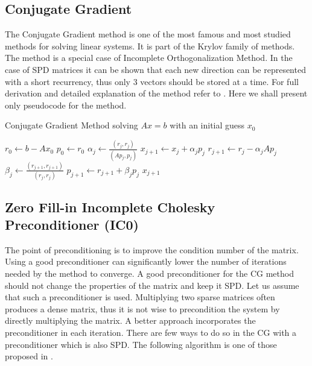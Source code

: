 \subsection{Conjugate Gradient}
The Conjugate Gradient method is one of the most famous and most studied methods for solving linear systems. It is part of the Krylov family of methods. The method is a special case of Incomplete Orthogonalization Method. In the case of SPD matrices it can be shown that each new direction can be represented with a short recurrency, thus only 3 vectors should be stored at a time. For full derivation and detailed explanation of the method refer to \cite{saad-sparse}. Here we shall present only pseudocode for the method.

\begin{algorithm}[H]
\centering
\caption{Conjugate Gradient Method solving $Ax=b$ with an initial guess $x_0$}\label{alg:CG}
\begin{algorithmic}[1]
			\State $r_0 \gets b - Ax_0$
			\State $p_0 \gets r_0$
				\State $\alpha_j \gets \frac{(r_j, r_j)}{(Ap_j, p_j)}$
				\State $x_{j+1} \gets x_j + \alpha_j p_j$
				\State $r_{j+1} \gets r_j - \alpha_j Ap_j$
				\State $\beta_j \gets \frac{(r_{j+1}, r_{j+1})}{(r_j, r_j)}$
				\State $p_{j+1} \gets r_{j+1} + \beta_j p_j$
			\EndFor
			\State \Return $x_{j+1}$
		\EndProcedure
\end{algorithmic}
\end{algorithm}

\subsection{Zero Fill-in Incomplete Cholesky Preconditioner (IC0)}
The point of preconditioning is to improve the condition number of the matrix. Using a good preconditioner can significantly lower the number of iterations needed by the method to converge. A good preconditioner for the CG method should not change the properties of the matrix and keep it SPD. Let us assume that such a preconditioner is used. Multiplying two sparse matrices often produces a dense matrix, thus it is not wise to precondition the system by directly multiplying the matrix. A better approach incorporates the preconditioner in each iteration. There are few ways to do so in the CG with a preconditioner which is also SPD. The following algorithm is one of those proposed in \cite{saad-sparse}.

